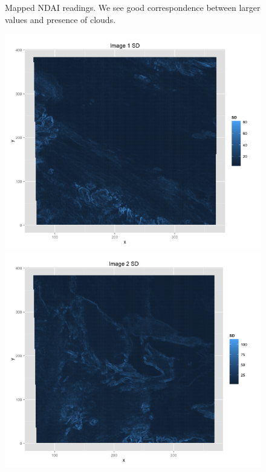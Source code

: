 \documentclass{article}\usepackage[]{graphicx}\usepackage[]{color}
\begin{document}
\begin{figure}
\caption{Mapped NDAI readings. We see good correspondence between larger values and presence of clouds.}
\end{figure}

\begin{figure}
\includegraphics[scale = .35]{Image1SD.png}
\includegraphics[scale = .35]{Image2SD.png}

\end{figure}
\end{document}
